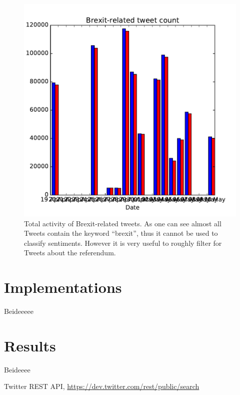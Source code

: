 \documentclass[a4paper, 8pt, twocolumn]{article}
\begin{document}
\begin{figure}[hp]
  \centering
  \includegraphics[width=\linewidth]{../frequency_brexit.pdf}
  \caption{Total activity of Brexit-related tweets. As one can see almost all Tweets contain the keyword ``brexit'',
           thus it cannot be used to classify sentiments. However it is very useful to roughly filter for Tweets about
           the referendum.}
\end{figure}

\section{Implementations}\label{sec:implementations}
%
%
Beideeeee

\section{Results}\label{sec:results}
%
%
Beideeee

\begin{thebibliography}{9} %

    Twitter REST API, 
    \url{https://dev.twitter.com/rest/public/search}

\end{thebibliography}
\end{document}
